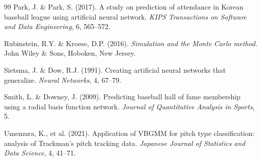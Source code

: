 \documentclass[12pt,a4paper]{article}
\begin{document}
\begin{thebibliography}{99}
Park, J. \& Park, S. (2017). A study on prediction of attendance in Korean baseball league using artificial neural network. \textit{KIPS Transactions on Software and Data Engineering}, 6, 565--572.

Rubinstein, R.Y. \& Kroese, D.P. (2016). \textit{Simulation and the Monte Carlo method}. John Wiley \& Sons, Hoboken, New Jersey.

Sietsma, J. \& Dow, R.J. (1991). Creating artificial neural networks that generalize. \textit{Neural Networks}, 4, 67--79.

Smith, L. \& Downey, J. (2009). Predicting baseball hall of fame membership using a radial basis function network. \textit{Journal of Quantitative Analysis in Sports}, 5.

Umemura, K., et al. (2021). Application of VBGMM for pitch type classification: analysis of Trackman's pitch tracking data. \textit{Japanese Journal of Statistics and Data Science}, 4, 41--71.

\end{thebibliography}
\end{document}
